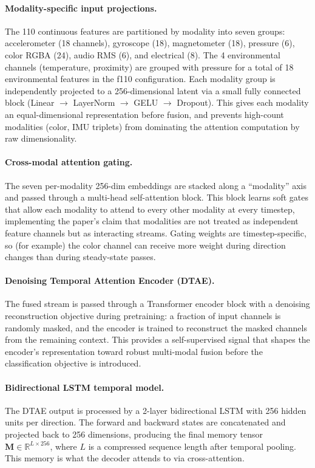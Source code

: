 \documentclass[sensors,article,submit,moreauthors,pdftex]{Definitions/mdpi}
\begin{document}
\paragraph{Modality-specific input projections.} The 110 continuous features are partitioned by modality into seven groups: accelerometer (18 channels), gyroscope (18), magnetometer (18), pressure (6), color RGBA (24), audio RMS (6), and electrical (8). The 4 environmental channels (temperature, proximity) are grouped with pressure for a total of 18 environmental features in the f110 configuration. Each modality group is independently projected to a 256-dimensional latent via a small fully connected block (Linear $\to$ LayerNorm $\to$ GELU $\to$ Dropout). This gives each modality an equal-dimensional representation before fusion, and prevents high-count modalities (color, IMU triplets) from dominating the attention computation by raw dimensionality.

\paragraph{Cross-modal attention gating.} The seven per-modality 256-dim embeddings are stacked along a ``modality'' axis and passed through a multi-head self-attention block. This block learns soft gates that allow each modality to attend to every other modality at every timestep, implementing the paper's claim that modalities are not treated as independent feature channels but as interacting streams. Gating weights are timestep-specific, so (for example) the color channel can receive more weight during direction changes than during steady-state passes.

\paragraph{Denoising Temporal Attention Encoder (DTAE).} The fused stream is passed through a Transformer encoder block with a denoising reconstruction objective during pretraining: a fraction of input channels is randomly masked, and the encoder is trained to reconstruct the masked channels from the remaining context. This provides a self-supervised signal that shapes the encoder's representation toward robust multi-modal fusion before the classification objective is introduced.

\paragraph{Bidirectional LSTM temporal model.} The DTAE output is processed by a 2-layer bidirectional LSTM with 256 hidden units per direction. The forward and backward states are concatenated and projected back to 256 dimensions, producing the final memory tensor $\mathbf{M} \in \mathbb{R}^{L \times 256}$, where $L$ is a compressed sequence length after temporal pooling. This memory is what the decoder attends to via cross-attention.
\end{document}

